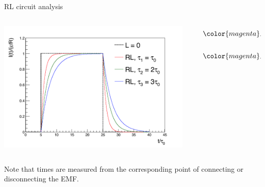 \begin{frame}{RL circuit analysis}

\begin{columns}
  \begin{column}{0.70\textwidth}
       \begin{center}
           \includegraphics[width=0.95\textwidth]{./images/misc/ItRL_2.png}\\
       \end{center}
  \end{column}
  \begin{column}{0.30\textwidth}

      \begin{equation*}
       {\color{magenta}
            I(t) = \frac{\mathcal{E}}{R} \Big(1 - exp^{-\frac{t}{\tau}} \Big)
       }
      \end{equation*}

      \begin{equation*}
      {\color{magenta}
           I(t) = \frac{\mathcal{E}}{R} \cdot exp^{-\frac{t}{\tau}}
      }
      \end{equation*}

  \end{column}
\end{columns}

{\scriptsize
   Note that times are measured from the corresponding point of
   connecting or disconnecting the EMF.\\
}

\end{frame}

%
%
%

